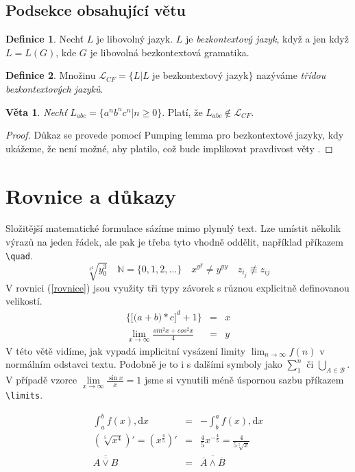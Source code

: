 \documentclass[11pt,twocolumn, a4paper]{article}
\theoremstyle{definition}
\newtheorem{definition}{Definice}[section]
\newtheorem{theorem}{Věta}
\begin{document}
\subsection{Podsekce obsahující větu}
\begin{definition} Nechť $L$ je libovolný jazyk. $L$ je \textit{bezkontextový jazyk}, když a jen když $L = L(G)$, kde $G$ je libovolná bezkontextová gramatika. \end{definition}
%
\begin{definition} Množinu $\mathcal{L}_{CF} = \{L|L$ je bezkontextový jazyk$\}$ nazýváme \textit{třídou bezkontextových jazyků}. \end{definition}
%
\label{veta} \begin{theorem} \textit{Nechť} $L_{abc} = \{a^n b^n c^n |n \geq 0 \}$. Platí, že $L_{abc} \notin \mathcal{L}_{CF}$. \end{theorem}
%
\begin{proof}
Důkaz se provede pomocí Pumping lemma pro bezkontextové jazyky, kdy ukážeme, že není možné, aby platilo, což bude implikovat pravdivost věty \pageref{veta}.\end{proof}
%
\section{Rovnice a důkazy}
Složitější matematické formulace sázíme mimo plynulý text. Lze umístit několik výrazů na jeden řádek, ale pak je třeba tyto vhodně oddělit, například příkazem {\ttfamily \verb|\quad|}. 
%
$$\sqrt[x^2]{y_{0}^{3}} \quad \mathbb{N} = \{0,1,2,...\} \quad x^{y^y} \neq y^{yy} \quad z_{i_j} \not\equiv z_{ij}$$
%
\indent V rovnici (\ref{rovnice}) jsou využity tři typy závorek s různou explicitně definovanou velikostí.
%
\begin{eqnarray}
\label{rovnice} \bigg\{\Big[\big(a+b\big)*c\Big]^d +1\bigg\} & = & x\\
\lim_{x \to \infty} \frac{sin^2 x + cos^2 x}{4} & = & y \nonumber
\end{eqnarray}
%
\indent V této větě vidíme, jak vypadá implicitní vysázení limity $\lim_{n \to \infty} f(n)$ v normálním odstavci textu. Podobně je to i s dalšími symboly jako $\sum_{1}^{n}$ či $\bigcup_{A \in \mathcal{B}}$. V případě vzorce $\lim\limits_{x \to \infty} \frac{\sin x}{x} = 1$ jsme si vynutili méně úspornou sazbu příkazem {\ttfamily \verb|\limits|}. \par
%
\setcounter{equation}{1}
\begin{eqnarray}
\int_a^b f(x), \mathrm{d}x & = & -\int_b^a f(x), \mathrm{d}x\\ 
\left(\sqrt[5]{x^4}\right)' = \left(x^{\frac{4}{5}}\right)' & = & \frac{4}{5}x^{-\frac{4}{5}} = \frac{4}{5\sqrt[5]{x}}\\
\overline{\overline{A \lor B}} & = & \overline{\overline{A} \land \overline{B}}
\end{eqnarray}
%
\end{document}
